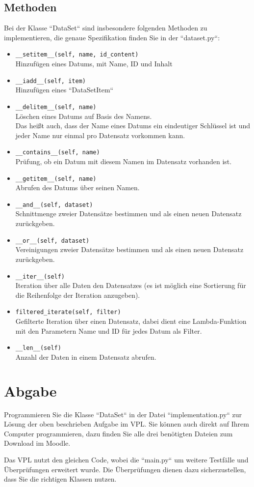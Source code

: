 \documentclass[12pt]{article}
\begin{document}
\subsection{Methoden}
Bei der Klasse ``DataSet`` sind insbesondere folgenden Methoden zu implementieren, die genaue Spezifikation finden Sie in der ``dataset.py``:
\begin{itemize}
    \item \texttt{\_\_setitem\_\_(self, name, id\_content)}\\Hinzufügen eines Datums, mit Name, ID und Inhalt
    \item \texttt{\_\_iadd\_\_(self, item)}\\Hinzufügen eines ``DataSetItem``
    \item \texttt{\_\_delitem\_\_(self, name)}\\Löschen eines Datums auf Basis des Namens.\\Das heißt auch, dass der Name eines Datums ein eindeutiger Schlüssel ist und jeder Name nur einmal pro Datensatz vorkommen kann.
    \item \texttt{\_\_contains\_\_(self, name)}\\Prüfung, ob ein Datum mit diesem Namen im Datensatz vorhanden ist.
    \item \texttt{\_\_getitem\_\_(self, name)}\\Abrufen des Datums über seinen Namen.
    \item \texttt{\_\_and\_\_(self, dataset)}\\Schnittmenge zweier Datensätze bestimmen und als einen neuen Datensatz zurückgeben.
    \item \texttt{\_\_or\_\_(self, dataset)}\\Vereinigungen zweier Datensätze bestimmen und als einen neuen Datensatz zurückgeben.
    \item \texttt{\_\_iter\_\_(self)}\\Iteration über alle Daten den Datensatzes (es ist möglich eine Sortierung für die Reihenfolge der Iteration anzugeben).
    \item \texttt{filtered\_iterate(self, filter)}\\Gefilterte Iteration über einen Datensatz, dabei dient eine Lambda-Funktion mit den Parametern Name und ID für jedes Datum als Filter.
    \item \texttt{\_\_len\_\_(self)}\\Anzahl der Daten in einem Datensatz abrufen.
\end{itemize}

\section{Abgabe}
Programmieren Sie die Klasse ``DataSet`` in der Datei ``implementation.py`` zur Lösung der oben beschrieben Aufgabe im VPL.
Sie können auch direkt auf Ihrem Computer programmieren, dazu finden Sie alle drei benötigten Dateien zum Download im Moodle.

Das VPL nutzt den gleichen Code, wobei die ``main.py`` um weitere Testfälle und Überprüfungen erweitert wurde.
Die Überprüfungen dienen dazu sicherzustellen, dass Sie die richtigen Klassen nutzen.
\end{document}
